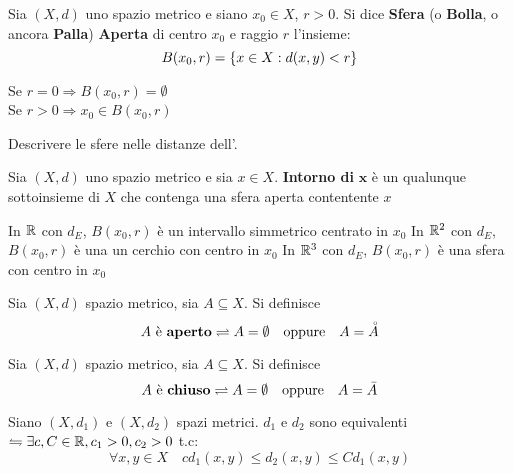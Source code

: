 \begin{definition}[Sfera]
	Sia $(X,d)$ uno spazio metrico e siano $x_0 \in X$, $r > 0$. Si dice \textbf{Sfera} (o \textbf{Bolla}, o ancora \textbf{Palla}) \textbf{Aperta} di centro $x_0$ e raggio $r$ l'insieme:
	$$B(x_0,r)=\left\{x\in X : d(x,y)<r\right\}$$
\end{definition}
\begin{observation}
	Se $r=0\Rightarrow B(x_0,r)=\emptyset$\\
	Se $r>0\Rightarrow x_0\in B(x_0,r)$
\end{observation}
\begin{exercise}
	Descrivere le sfere nelle distanze dell'.
\end{exercise}

\begin{definition}[Intorno]
	Sia $(X,d)$ uno spazio metrico e sia $x \in X$. \textbf{Intorno di} $\boldsymbol{x}$ è un qualunque sottoinsieme di $X$ che contenga una sfera aperta contentente $x$
\end{definition}

\example
In $\mathbb{R}$ con $d_E$, $B(x_0,r)$ è un intervallo simmetrico centrato in $x_0$
\example
In $\mathbb{R}^2$ con $d_E$, $B(x_0,r)$ è una un cerchio con centro in $x_0$
\example
In $\mathbb{R}^3$ con $d_E$, $B(x_0,r)$ è una sfera con centro in $x_0$
\example

\begin{definition}
	\label{def:aperto}
	Sia $(X,d)$ spazio metrico, sia $A\subseteq X$. Si definisce
	$$A\text{ è \textbf{aperto}}\rightleftharpoons A=\emptyset\quad\text{oppure}\quad A=\accentset{\circ}{A}$$
\end{definition}

\begin{definition}
	\label{def:chiuso}
	Sia $(X,d)$ spazio metrico, sia $A\subseteq X$. Si definisce
	$$A\text{ è \textbf{chiuso}}\rightleftharpoons A=\emptyset\quad\text{oppure}\quad A=\bar{A}$$
\end{definition}

Siano $(X,d_1)$ e $(X,d_2)$ spazi metrici. $d_1$ e $d_2$ sono equivalenti $\leftrightharpoons \exists c,C\in\mathbb{R}, c_1>0, c_2>0$ t.c:
$$ \forall x,y \in X\quad cd_1(x,y)\le d_2(x,y)\le Cd_1(x,y) $$

